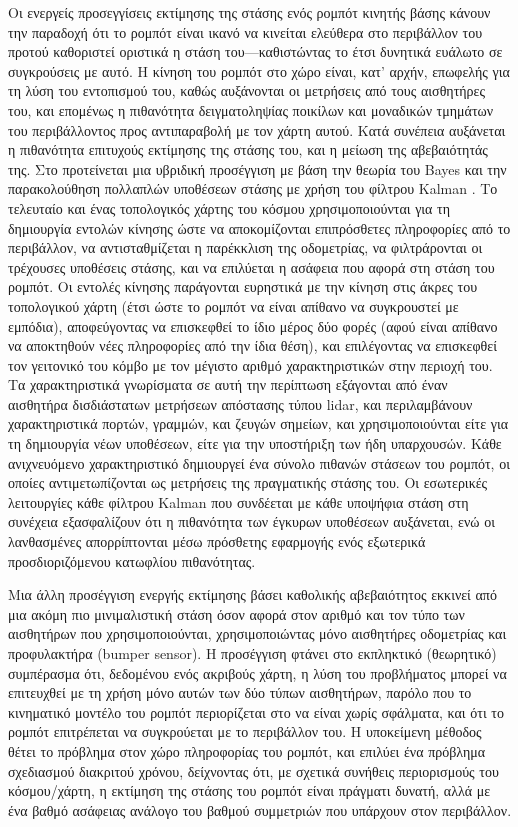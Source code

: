 Οι ενεργείς προσεγγίσεις εκτίμησης της στάσης ενός ρομπότ κινητής βάσης κάνουν
την παραδοχή ότι το ρομπότ είναι ικανό να κινείται ελεύθερα στο περιβάλλον του
προτού καθοριστεί οριστικά η στάση του---καθιστώντας το έτσι δυνητικά ευάλωτο
σε συγκρούσεις με αυτό. Η κίνηση του ρομπότ στο χώρο είναι, κατ' αρχήν,
επωφελής για τη λύση του εντοπισμού του, καθώς αυξάνονται οι μετρήσεις από τους
αισθητήρες του, και επομένως η πιθανότητα δειγματοληψίας ποικίλων και μοναδικών
τμημάτων του περιβάλλοντος προς αντιπαραβολή με τον χάρτη αυτού. Κατά συνέπεια
αυξάνεται η πιθανότητα επιτυχούς εκτίμησης της στάσης του, και η μείωση της
αβεβαιότητάς της. Στο \cite{Jensfelt2001a} προτείνεται μια υβριδική προσέγγιση
με βάση την θεωρία του Bayes \cite{thrun2005probabilistic} και την
παρακολούθηση πολλαπλών υποθέσεων στάσης με χρήση του φίλτρου Kalman
\cite{Maybeck1979}. Το τελευταίο και ένας τοπολογικός χάρτης του κόσμου
χρησιμοποιούνται για τη δημιουργία εντολών κίνησης ώστε να αποκομίζονται
επιπρόσθετες πληροφορίες από το περιβάλλον, να αντισταθμίζεται η παρέκκλιση της
οδομετρίας, να φιλτράρονται οι τρέχουσες υποθέσεις στάσης, και να επιλύεται η
ασάφεια που αφορά στη στάση του ρομπότ. Οι εντολές κίνησης παράγονται ευρηστικά
με την κίνηση στις άκρες του τοπολογικού χάρτη (έτσι ώστε το ρομπότ να είναι
απίθανο να συγκρουστεί με εμπόδια), αποφεύγοντας να επισκεφθεί το ίδιο μέρος
δύο φορές (αφού είναι απίθανο να αποκτηθούν νέες πληροφορίες από την ίδια
θέση), και επιλέγοντας να επισκεφθεί τον γειτονικό του κόμβο με τον μέγιστο
αριθμό χαρακτηριστικών στην περιοχή του. Τα χαρακτηριστικά γνωρίσματα σε αυτή
την περίπτωση εξάγονται από έναν αισθητήρα δισδιάστατων μετρήσεων απόστασης
τύπου lidar, και περιλαμβάνουν χαρακτηριστικά πορτών, γραμμών, και ζευγών
σημείων, και χρησιμοποιούνται είτε για τη δημιουργία νέων υποθέσεων, είτε για
την υποστήριξη των ήδη υπαρχουσών.  Κάθε ανιχνευόμενο χαρακτηριστικό δημιουργεί
ένα σύνολο πιθανών στάσεων του ρομπότ, οι οποίες αντιμετωπίζονται ως μετρήσεις
της πραγματικής στάσης του.  Οι εσωτερικές λειτουργίες κάθε φίλτρου Kalman που
συνδέεται με κάθε υποψήφια στάση στη συνέχεια εξασφαλίζουν ότι η πιθανότητα των
έγκυρων υποθέσεων αυξάνεται, ενώ οι λανθασμένες απορρίπτονται μέσω πρόσθετης
εφαρμογής ενός εξωτερικά προσδιοριζόμενου κατωφλίου πιθανότητας.

Μια άλλη προσέγγιση ενεργής εκτίμησης βάσει καθολικής αβεβαιότητος \cite{OKane}
εκκινεί από μια ακόμη πιο μινιμαλιστική στάση όσον αφορά στον αριθμό και τον
τύπο των αισθητήρων που χρησιμοποιούνται, χρησιμοποιώντας μόνο αισθητήρες
οδομετρίας και προφυλακτήρα (bumper sensor). Η προσέγγιση φτάνει στο εκπληκτικό
(θεωρητικό) συμπέρασμα ότι, δεδομένου ενός ακριβούς χάρτη, η λύση του
προβλήματος μπορεί να επιτευχθεί με τη χρήση μόνο αυτών των δύο τύπων
αισθητήρων, παρόλο που το κινηματικό μοντέλο του ρομπότ περιορίζεται στο να
είναι χωρίς σφάλματα, και ότι το ρομπότ επιτρέπεται να συγκρούεται με το
περιβάλλον του. Η υποκείμενη μέθοδος θέτει το πρόβλημα στον χώρο πληροφορίας
του ρομπότ, και επιλύει ένα πρόβλημα σχεδιασμού διακριτού χρόνου, δείχνοντας
ότι, με σχετικά συνήθεις περιορισμούς του κόσμου/χάρτη, η εκτίμηση της στάσης
του ρομπότ είναι πράγματι δυνατή, αλλά με ένα βαθμό ασάφειας ανάλογο του βαθμού
συμμετριών που υπάρχουν στον περιβάλλον.

